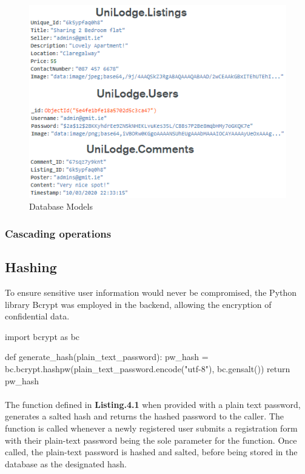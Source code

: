 \begin{figure}[H]
	\caption{Database Models}
	\label{image:models}
	\centering
	\includegraphics[width=1\textwidth]{images/models.png}
\end{figure}	

\subsubsection{Cascading operations}

\subsection{Hashing}
To ensure sensitive user information would never be compromised, the Python library Bcrypt was employed in the backend, allowing the encryption of confidential data. \newline

\begin{python}[caption=Hashing a Password with Bcrypt]
import bcrypt as bc

def generate_hash(plain_text_password):
    pw_hash = bc.bcrypt.hashpw(plain_text_password.encode("utf-8"), bc.gensalt())
    return pw_hash
\end{python}

\paragraph{}
The function defined in \textbf{Listing.4.1} when provided with a plain text password, generates a salted hash and returns the hashed password to the caller. The function is called whenever a newly registered user submits a registration form with their plain-text password being the sole parameter for the function. Once called, the plain-text password is hashed and salted, before being stored in the database as the designated hash. \newline

